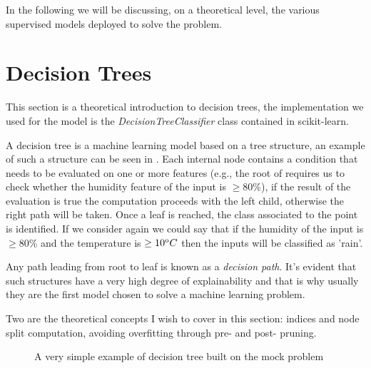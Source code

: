 \medskip

In the following we will be discussing, on a theoretical level, the various supervised models deployed
to solve the problem.

\section{Decision Trees}
\label{sec:dt}
This section is a theoretical introduction to decision trees, the implementation we used for the
model is the \emph{DecisionTreeClassifier} class contained in scikit-learn.

\medskip

A decision tree is a machine learning model based on a tree structure, an example of such a
structure can be seen in . Each internal node contains a condition that needs to
be evaluated on one or more features (e.g.,  the root of  requires us to check
whether the humidity feature of the input is $\geq 80\%$), if the result of the evaluation is true
the computation proceeds with the left child, otherwise the right path will be taken. Once a leaf is
reached, the class associated to the point is identified. If we consider again 
we could say that if the humidity of the input is $\geq 80\%$ and the temperature is $\geq 10^\text{o}C$ then
the inputs will be classified as 'rain'.

Any path leading from root to leaf is known as a \emph{decision path}. It's evident that such structures have a very high degree of explainability and that is why usually they are the first model chosen to solve a machine learning problem.

\medskip

Two are the theoretical concepts I wish to cover in this section: indices and node split
computation, avoiding overfitting through pre- and post- pruning.
\begin{figure}
	\centering
	\caption{A very simple example of decision tree built on the mock problem}
	\label{fig:simple-dt}
\end{figure}
